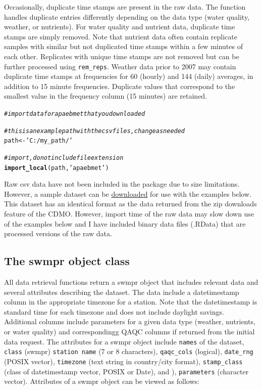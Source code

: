 \documentclass[10pt,letterpaper]{article}\usepackage[]{graphicx}\usepackage[]{color}
\makeatletter
\newcommand{\hlstr}[1]{\textcolor[rgb]{0.192,0.494,0.8}{#1}}%
\newcommand{\hlcom}[1]{\textcolor[rgb]{0.678,0.584,0.686}{\textit{#1}}}%
\newcommand{\hlstd}[1]{\textcolor[rgb]{0.345,0.345,0.345}{#1}}%
\newcommand{\hlkwb}[1]{\textcolor[rgb]{0.69,0.353,0.396}{#1}}%
\newcommand{\hlkwd}[1]{\textcolor[rgb]{0.737,0.353,0.396}{\textbf{#1}}}%
\newenvironment{kframe}{%
 \def\at@end@of@kframe{}%
 \ifinner\ifhmode%
  \def\at@end@of@kframe{\end{minipage}}%
  \begin{minipage}{\columnwidth}%
 \fi\fi%
 \def\FrameCommand##1{\hskip\@totalleftmargin \hskip-\fboxsep
 \colorbox{shadecolor}{##1}\hskip-\fboxsep
     \hskip-\linewidth \hskip-\@totalleftmargin \hskip\columnwidth}%
 \MakeFramed {\advance\hsize-\width
   \@totalleftmargin\z@ \linewidth\hsize
   \@setminipage}}%
 {\par\unskip\endMakeFramed%
 \at@end@of@kframe}
\newenvironment{knitrout}{}{} %
\makeatother
\begin{document}
Occasionally, duplicate time stamps are present in the raw data.  The function handles duplicate entries differently depending on the data type (water quality,  weather, or nutrients).  For water quality and nutrient data, duplicate time stamps are simply removed.  Note that nutrient data often contain replicate samples with similar but not duplicated time stamps within a few minutes of each other.  Replicates with unique time stamps are not removed but can be further processed using \texttt{rem\_reps}.  Weather data prior to 2007 may contain duplicate time stamps at frequencies for 60 (hourly) and 144 (daily) averages, in addition to 15 minute frequencies.  Duplicate values that correspond to the smallest value in the frequency column (15 minutes) are retained.  

\begin{knitrout}
\color{fgcolor}\begin{kframe}
\begin{alltt}
\hlcom{# import data for apaebmet that you downloaded}

\hlcom{# this is an example path with the csv files, change as needed}
\hlstd{path} \hlkwb{<-} \hlstr{'C:/my_path/'}

\hlcom{# import, do not include file extension}
\hlkwd{import_local}\hlstd{(path,} \hlstr{'apaebmet'}\hlstd{)}
\end{alltt}
\end{kframe}
\end{knitrout}

Raw csv data have not been included in the package due to size limitations.  However, a sample dataset can be \href{https://s3.amazonaws.com/swmpexdata/zip_ex.zip}{downloaded} for use with the examples below.  This dataset has an identical format as the data returned from the zip downloads feature of the CDMO.  However, import time of the raw data may slow down use of the examples below and I have included binary data files (.RData) that are processed versions of the raw data.    

\subsection*{The swmpr object class}

All data retrieval functions return a swmpr object that includes relevant data and several attributes describing the dataset.  The data include a datetimestamp column in the appropriate timezone for a station.  Note that the datetimestamp is standard time for each timezone and does not include daylight savings. Additional columns include parameters for a given data type (weather, nutrients, or water quality) and correspondingg QAQC columns if returned from the initial data request.  The attributes for a swmpr object include \texttt{names} of the dataset, \texttt{class} (swmpr) \texttt{station name} (7 or 8 characters), \texttt{qaqc\_cols} (logical), \texttt{date\_rng} (POSIX vector), \texttt{timezone} (text string in country/city format), \texttt{stamp\_class} (class of datetimestamp vector, POSIX or Date), and ), \texttt{parameters} (character vector).  Attributes of a swmpr object can be viewed as follows:
\end{document}

